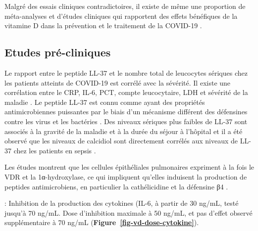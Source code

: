 \documentclass[
  a4paper,
  DIV=11,
  numbers=noendperiod,
  listof=totoc]{scrreprt}
\begin{document}
Malgré des essais cliniques contradictoires, il existe de même une
proportion de méta-analyses et d'études cliniques qui rapportent des
effets bénéfiques de la vitamine D dans la prévention et le traitement
de la COVID-19 \autocite{Pal.2022}.

\subsection{Etudes pré-cliniques}\label{etudes-pruxe9-cliniques}

Le rapport entre le peptide LL-37 et le nombre total de leucocytes
sériques chez les patients atteints de COVID-19 est corrélé avec la
sévérité. Il existe une corrélation entre le CRP, IL‑6, PCT, compte
leucocytaire, LDH et sévérité de la maladie \autocite{Keutmann.2022}. Le
peptide LL-37 est connu comme ayant des propriétés antimicrobiennes
puissantes par le biais d'un mécanisme différent des défensines contre
les virus et les bactéries \autocite{Cutuli.2024}. Des niveaux sériques
plus faibles de LL-37 sont associés à la gravité de la maladie et à la
durée du séjour à l'hôpital \autocite{Keutmann.2022} et il a été observé
que les niveaux de calcidiol sont directement corrélés aux niveaux de
LL-37 chez les patients en sepsis \autocite{Cutuli.2024}.

Les études montrent que les cellules épithéliales pulmonaires expriment
à la fois le VDR et la 1α-hydroxylase, ce qui impliquent qu'elles
induisent la production de peptides antimicrobiens, en particulier la
cathélicidine et la défensine β4 \autocite{Cutuli.2024}.

\textcite{Zhang.2012}: Inhibition de la production des cytokines (IL-6,
à partir de 30 ng/mL, testé jusqu'à 70 ng/mL. Dose d'inhibition maximale
à 50 ng/mL, et pas d'effet observé supplémentaire à 70 ng/mL
(\textbf{Figure~\ref{fig-vd-dose-cytokine}}).
\end{document}
